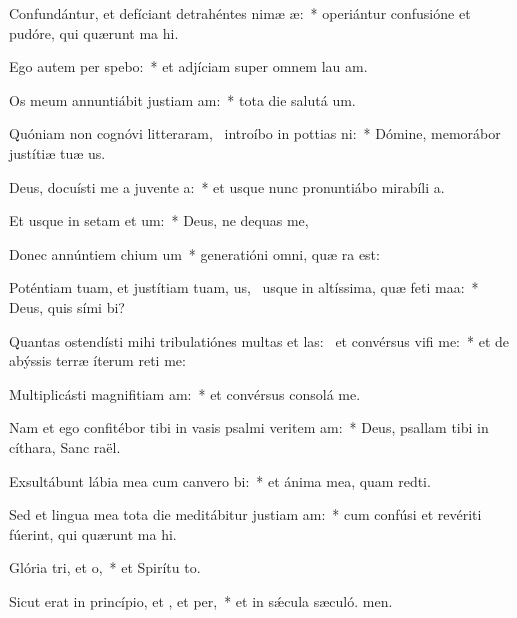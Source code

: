 \item Confundántur, et defíciant detrahéntes nimæ æ:~* operiántur confusióne et pudóre, qui quærunt ma hi.
\item Ego autem per spebo:~* et adjíciam super omnem lau am.
\item Os meum annuntiábit justiam am:~* tota die salutá um.
\item Quóniam non cognóvi litteraram,~\pscross{} introíbo in pottias ni:~* Dómine, memorábor justítiæ tuæ us.
\item Deus, docuísti me a juvente a:~* et usque nunc pronuntiábo mirabíli a.
\item Et usque in setam et um:~* Deus, ne dequas me,
\item Donec annúntiem chium um~* generatióni omni, quæ ra est:
\item Poténtiam tuam, et justítiam tuam, us,~\pscross{} usque in altíssima, quæ feti maa:~* Deus, quis sími bi?
\item Quantas ostendísti mihi tribulatiónes multas et las:~\pscross{} et convérsus vifi me:~* et de abýssis terræ íterum reti me:
\item Multiplicásti magnifitiam am:~* et convérsus consolá  me.
\item Nam et ego confitébor tibi in vasis psalmi veritem am:~* Deus, psallam tibi in cíthara, Sanc raël.
\item Exsultábunt lábia mea cum canvero bi:~* et ánima mea, quam redti.
\item Sed et lingua mea tota die meditábitur justiam am:~* cum confúsi et revériti fúerint, qui quærunt ma hi.
\item Glória tri, et o,~* et Spirítu to.
\item Sicut erat in princípio, et , et per,~* et in sǽcula sæculó. men.
